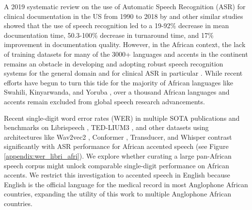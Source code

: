 \documentclass[11pt,a4paper]{article}
\begin{document}
A 2019 systematic review on the use of Automatic Speech Recognition (ASR) for clinical documentation in the US from 1990 to 2018 by \citet{blackley2019speech} and other similar studies \citep{goss2019clinician, blackley2020physician, ahlgrim2016introduction, vogel2015analysis} showed that the use of speech recognition led to a 19-92\% decrease in mean documentation time, 50.3-100\% decrease in turnaround time, and 17\% improvement in documentation quality. %
However, in the African context, the lack of training datasets for many of the 3000+ languages and accents in the continent remains an obstacle in developing and adopting robust speech recognition systems for the general domain and for clinical ASR in particular \citep{doumbouya2021using, siminyu2021ai4d, babirye2022building, ogayo2022building}. While recent efforts have begun to turn this tide for the majority of African languages like Swahili, Kinyarwanda, and Yoruba \citep{gutkin2020developing, dossou2021okwugb, Olaleye2022YFACCAY}, over a thousand African languages and accents remain excluded from global speech research advancements. 

Recent single-digit word error rates (WER) \citep{chen2022wavlm, radford2022robust, hsu2021hubert, Baevski2020wav2vec2A} in multiple SOTA publications and benchmarks on Librispeech \citep{panayotov2015librispeech}, TED-LIUM3 \citep{hernandez2018ted}, and other datasets using architectures like Wav2vec2 \cite{Baevski2020wav2vec2A}, Conformer \cite{gulati2020conformer}, Transducer, and Whisper \cite{radford2022robust} contrast significantly with ASR performance for African accented speech \citep{gutkin2020developing, dossou2021okwugb} (see Figure \ref{appendix:wer_libri_afri}). We explore whether curating a large pan-African speech corpus might unlock comparable single-digit performance on African accents. We restrict this investigation to accented speech in English because English is the official language for the medical record in most Anglophone African countries, expanding the utility of this work to multiple Anglophone African countries. 

\end{document}
